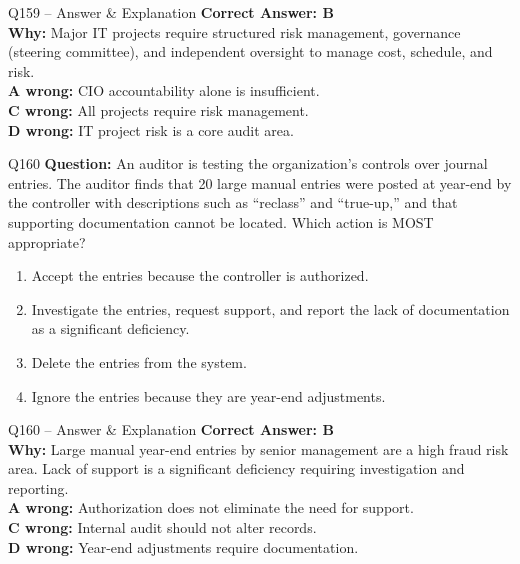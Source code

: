 \documentclass[aspectratio=169,10pt]{beamer}
\begin{document}
	\begin{frame}[t]{Q159 -- Answer \& Explanation}
		\small
		\textbf{Correct Answer: B} \\[4pt]
		\textbf{Why:} Major IT projects require structured risk management, governance (steering committee), and independent oversight to manage cost, schedule, and risk. \\[4pt]
		\textbf{A wrong:} CIO accountability alone is insufficient. \\[2pt]
		\textbf{C wrong:} All projects require risk management. \\[2pt]
		\textbf{D wrong:} IT project risk is a core audit area.
	\end{frame}
	
	\begin{frame}[t]{Q160}
		\small
		\textbf{Question:} An auditor is testing the organization's controls over journal entries. The auditor finds that 20 large manual entries were posted at year-end by the controller with descriptions such as ``reclass'' and ``true-up,'' and that supporting documentation cannot be located. Which action is MOST appropriate?
		\begin{enumerate}[label=\Alph*.,itemsep=1pt,topsep=2pt]
			\item Accept the entries because the controller is authorized.
			\item Investigate the entries, request support, and report the lack of documentation as a significant deficiency.
			\item Delete the entries from the system.
			\item Ignore the entries because they are year-end adjustments.
		\end{enumerate}
	\end{frame}
	
	\begin{frame}[t]{Q160 -- Answer \& Explanation}
		\small
		\textbf{Correct Answer: B} \\[4pt]
		\textbf{Why:} Large manual year-end entries by senior management are a high fraud risk area. Lack of support is a significant deficiency requiring investigation and reporting. \\[4pt]
		\textbf{A wrong:} Authorization does not eliminate the need for support. \\[2pt]
		\textbf{C wrong:} Internal audit should not alter records. \\[2pt]
		\textbf{D wrong:} Year-end adjustments require documentation.
	\end{frame}
	
\end{document}
